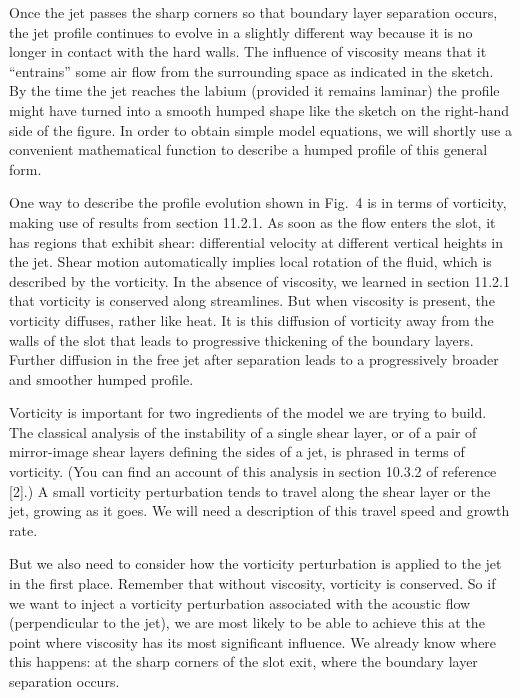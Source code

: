   Once the jet passes the sharp corners so that boundary layer separation 
  occurs, the jet profile continues to evolve in a slightly different way 
  because it is no longer in contact with the hard walls. The influence of 
  viscosity means that it ``entrains'' some air flow from the surrounding space 
  as indicated in the sketch. By the time the jet reaches the labium (provided 
  it remains laminar) the profile might have turned into a smooth humped shape 
  like the sketch on the right-hand side of the figure. In order to obtain 
  simple model equations, we will shortly use a convenient mathematical 
  function to describe a humped profile of this general form. 

  One way to describe the profile evolution shown in Fig.\ 4 is in terms of 
  vorticity, making use of results from section 11.2.1. As soon as the flow 
  enters the slot, it has regions that exhibit shear: differential velocity at 
  different vertical heights in the jet. Shear motion automatically implies 
  local rotation of the fluid, which is described by the vorticity. In the 
  absence of viscosity, we learned in section 11.2.1 that vorticity is 
  conserved along streamlines. But when viscosity is present, the vorticity 
  diffuses, rather like heat. It is this diffusion of vorticity away from the 
  walls of the slot that leads to progressive thickening of the boundary 
  layers. Further diffusion in the free jet after separation leads to a 
  progressively broader and smoother humped profile. 

  Vorticity is important for two ingredients of the model we are trying to 
  build. The classical analysis of the instability of a single shear layer, or 
  of a pair of mirror-image shear layers defining the sides of a jet, is 
  phrased in terms of vorticity. (You can find an account of this analysis in 
  section 10.3.2 of reference [2].) A small vorticity perturbation tends to 
  travel along the shear layer or the jet, growing as it goes. We will need a 
  description of this travel speed and growth rate. 

  But we also need to consider how the vorticity perturbation is applied to the 
  jet in the first place. Remember that without viscosity, vorticity is 
  conserved. So if we want to inject a vorticity perturbation associated with 
  the acoustic flow (perpendicular to the jet), we are most likely to be able 
  to achieve this at the point where viscosity has its most significant 
  influence. We already know where this happens: at the sharp corners of the 
  slot exit, where the boundary layer separation occurs. 

